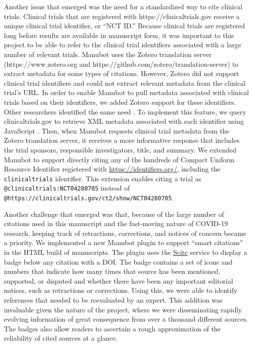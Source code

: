 \documentclass[sigconf]{acmart}
\begin{document}
Another issue that emerged was the need for a standardized way to cite clinical trials.
Clinical trials that are registered with https://clinicaltrials.gov receive a unique clinical trial identifier, or ``NCT ID.''
Because clinical trials are registered long before results are available in manuscript form, it was important to this project to be able to refer to the clinical trial identifiers associated with a large number of relevant trials. %
Manubot uses the Zotero translation server (https://www.zotero.org and https://github.com/zotero/translation-server) to extract metadata for some types of citations.
However, Zotero did not support clinical trial identifiers and could not extract relevant metadata from the clinical trial's URL.
In order to enable Manubot to pull metadata associated with clinical trials based on their identifiers, we added Zotero support for these identifiers.
Other researchers identified the same need \citep{ZQPtEdnO, thdq2nGf}.
To implement this feature, we query clinicaltrials.gov to retrieve XML metadata associated with each identifier using JavaScript \citep{Bxfd7L4s}.
Then, when Manubot requests clinical trial metadata from the Zotero translation server, it receives a more informative response that includes the trial sponsors, responsible investigators, title, and summary.
We extended Manubot to support directly citing any of the hundreds of Compact Uniform Resource Identifier registered with \url{https://identifiers.org/}, including the \texttt{clinicaltrials} identifier.
This extension enables citing a trial as \texttt{@clinicaltrials:NCT04280705} instead of \texttt{@https://clinicaltrials.gov/ct2/show/NCT04280705}.

Another challenge that emerged was that, because of the large number of citations used in this manuscript and the fast-moving nature of COVID-19 research, keeping track of retractions, corrections, and notices of concern became a priority.
We implemented a new Manubot plugin to support ``smart citations'' in the HTML build of manuscripts.
The plugin uses the \href{https://scite.ai/}{Scite} \citep{14UJbLWf4} service to display a badge below any citation with a DOI.
The badge contains a set of icons and numbers that indicate how many times that source has been mentioned, supported, or disputed and whether there have been any important editorial notices, such as retractions or corrections.
Using this, we were able to identify references that needed to be reevaluated by an expert.
This addition was invaluable given the nature of the project, where we were disseminating rapidly evolving information of great consequence from over a thousand different sources.
The badges also allow readers to ascertain a rough approximation of the reliability of cited sources at a glance.
\end{document}
